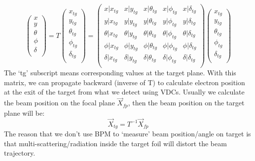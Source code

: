 \begin{equation}
    \begin{pmatrix}
	x   \\
	y   \\
	\theta	\\
	\phi	\\
	\delta	\\
    \end{pmatrix}
    =
    T
    \begin{pmatrix}
	x_{tg}   \\
	y_{tg}   \\
	\theta_{tg}	\\
	\phi_{tg}	\\
	\delta_{tg}	\\
    \end{pmatrix}
    =
    \begin{pmatrix}
	x|x_{tg} & x|y_{tg}   & x|\theta_{tg}	& x|\phi_{tg}    & x|\delta_{tg}    \\
	y|x_{tg} & y|y_{tg}   & y|\theta_{tg}	& y|\phi_{tg}    & y|\delta_{tg}    \\
	\theta|x_{tg} & \theta|y_{tg}   & \theta|\theta_{tg}	& \theta|\phi_{tg}    & \theta|\delta_{tg}    \\
	\phi|x_{tg} & \phi|y_{tg}   & \phi|\theta_{tg}	& \phi|\phi_{tg}    & \phi|\delta_{tg}    \\
	\delta|x_{tg} & \delta|y_{tg}   & \delta|\theta_{tg}	& \delta|\phi_{tg}    & \delta|\delta_{tg}    \\
    \end{pmatrix}
    \begin{pmatrix}
	x_{tg}   \\
	y_{tg}   \\
	\theta_{tg}	\\
	\phi_{tg}	\\
	\delta_{tg}	\\
    \end{pmatrix}
\end{equation}
The `tg' subscript means corresponding values at the target plane. With this matrix, we can
propagate backward (inverse of T) to calculate electron position at the exit 
of the target from what we detect using VDCs. Usually we calculate the beam
position on the focal plane $\vec{X}_{fp}$, then the beam position on the target
plane will be: 
\begin{equation}
    \vec{X}_{tg} = T^{-1} \vec{X}_{fp}
    \label{eq:reconstruction}
\end{equation}
The reason that we don't use BPM to `measure' beam position/angle on target is that 
multi-scattering/radiation inside the target foil will distort the beam trajectory. 

